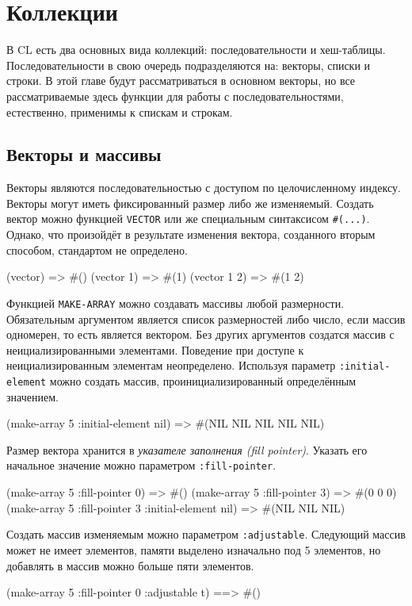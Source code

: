 \section{Коллекции}
В CL есть два основных вида коллекций: последовательности и хеш-таблицы. Последовательности в свою очередь подразделяются на: векторы, списки и строки. В этой главе будут рассматриваться в основном векторы, но все рассматриваемые здесь функции для работы с последовательностями, естественно, применимы к спискам и строкам.

\subsection{Векторы и массивы}
Векторы являются последовательностью с доступом по целочисленному индексу. Векторы могут иметь фиксированный размер либо же изменяемый. Создать вектор можно функцией \lstinline{VECTOR} или же специальным синтаксисом \lstinline{#(...)}. Однако, что произойдёт в результате изменения вектора, созданного вторым способом, стандартом не определено.
\begin{cllst}{}{}
(vector)     => #()
(vector 1)   => #(1)
(vector 1 2) => #(1 2)
\end{cllst}

Функцией \lstinline{MAKE-ARRAY} можно создавать массивы любой размерности. Обязательным аргументом является список размерностей либо число, если массив одномерен, то есть является вектором. Без других аргументов создатся массив с неициализированными элементами. Поведение при доступе к неициализированным элементам неопределено. Используя параметр \lstinline{:initial-element} можно создать массив, проинициализированный определённым значением.
\begin{cllst}{}{}
(make-array 5 :initial-element nil) => #(NIL NIL NIL NIL NIL)
\end{cllst}

Размер вектора хранится в \emph{указателе заполнения (fill pointer)}. Указать его начальное значение можно параметром \lstinline{:fill-pointer}.
\begin{cllst}{}{}
(make-array 5 :fill-pointer 0) => #()
(make-array 5 :fill-pointer 3) => #(0 0 0)
(make-array 5 :fill-pointer 3 :initial-element nil) => #(NIL NIL NIL)
\end{cllst}

Создать массив изменяемым можно параметром \lstinline{:adjustable}. Следующий массив может не имеет элементов, памяти выделено изначально под 5 элементов, но добавлять в массив можно больше пяти элементов.
\begin{cllst}{}{}
(make-array 5 :fill-pointer 0 :adjustable t) ==> #()
\end{cllst}

